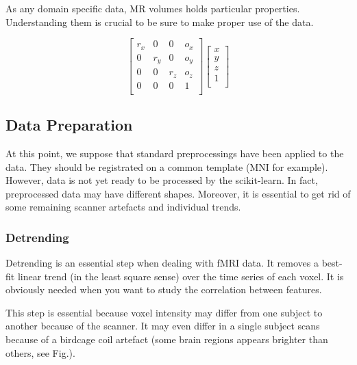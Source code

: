 \documentclass{frontiersSCNS} %
\begin{document}
As any domain specific data, MR volumes holds particular properties.
Understanding them is crucial to be sure to make proper use of the data.

\[
    \begin{bmatrix}
        r_x & 0   & 0   & o_x \\
        0   & r_y & 0   & o_y \\
        0   & 0   & r_z & o_z \\
        0   & 0   & 0   & 1   \\
    \end{bmatrix}
    \begin{bmatrix}
        x \\
        y \\
        z \\
        1 \\
    \end{bmatrix}
\]

\subsection{Data Preparation}

At this point, we suppose that standard preprocessings have been applied to the
data. They should be registrated on a common template (MNI for example).
However, data is not yet ready to be processed by the scikit-learn. In
fact, preprocessed data may have different shapes. Moreover, it is essential to
get rid of some remaining scanner artefacts and individual trends.

\subsubsection{Detrending}

Detrending is an essential step when dealing with fMRI data. It removes a
best-fit linear trend (in the least square sense) over the time series of each
voxel. It is obviously needed when you want to study the correlation between
features.

This step is essential because voxel intensity may differ from one subject to
another because of the scanner. It may even differ in a single subject scans
because of a birdcage coil artefact (some brain regions appears brighter than
others, see Fig.).

\end{document}
